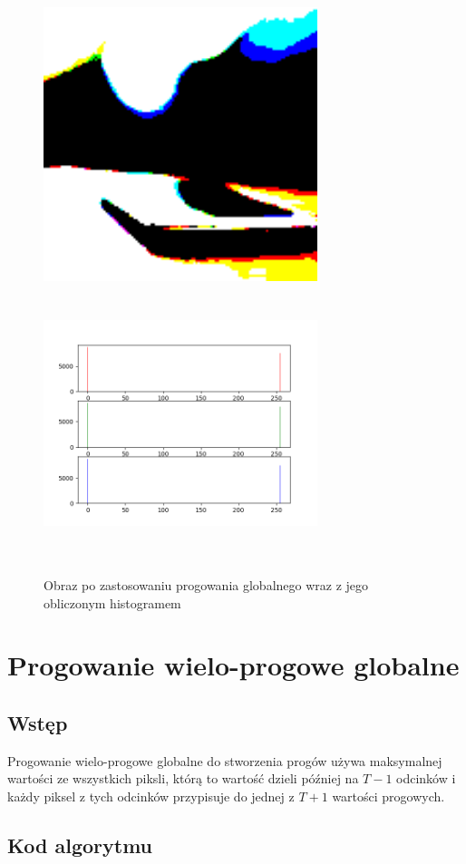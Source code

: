 \documentclass[a4paper,12pt]{book}
\begin{document}
\begin{figure}[H]
	\caption{Obraz po zastosowaniu progowania globalnego wraz z jego obliczonym histogramem}
	\includegraphics[width=8cm, height=8cm]{6-6/single-global-threshold-image-phone.png}
	\includegraphics[width=8cm, height=8cm]{6-6/single-global-threshold-phone.png}
\end{figure}

\section{Progowanie wielo-progowe globalne}
\subsection*{Wstęp}
Progowanie wielo-progowe globalne do stworzenia progów używa maksymalnej wartości ze wszystkich piksli, którą to wartość dzieli później na $T-1$ odcinków i każdy piksel z tych odcinków przypisuje do jednej z $T+1$ wartości progowych. 

\subsection*{Kod algorytmu}
\end{document}
